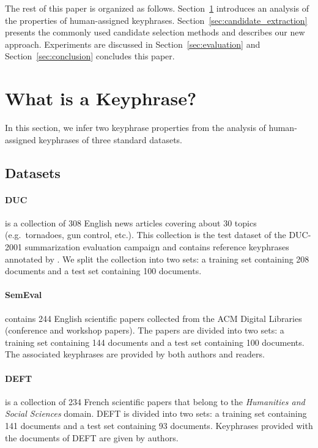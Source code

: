   The rest of this paper is organized as follows.
  Section~\ref{sec:definition_of_candidate_keyphrases} introduces an analysis of
  the properties of human-assigned keyphrases.
  Section~\ref{sec:candidate_extraction} presents the commonly used candidate
  selection methods and describes our new approach. Experiments are discussed in
  Section~\ref{sec:evaluation} and Section~\ref{sec:conclusion} concludes this
  paper.

\section{What is a Keyphrase?}
\label{sec:definition_of_candidate_keyphrases}
  In this section, we infer two keyphrase properties from the analysis of
  human-assigned keyphrases of three standard datasets.

  \subsection{Datasets}
  \label{subsec:keyphrase_extraction_datasets}
    \paragraph{DUC~\textnormal{\cite{over2001duc}}} is a collection of 308
    English news articles covering about 30 topics (e.g.~tornadoes, gun control,
    etc.). This collection is the test dataset of the DUC-2001 summarization
    evaluation campaign and contains reference keyphrases annotated by
    . We split the collection into two sets: a
    training set containing 208 documents and a test set containing 100
    documents.

    \paragraph{SemEval~\textnormal{\cite{kim2010semeval}}} contains 244 English
    scientific papers collected from the ACM Digital Libraries (conference and
    workshop papers). The papers are divided into two sets: a training set
    containing 144 documents and a test set containing 100 documents. The
    associated keyphrases are provided by both authors and readers.

    \paragraph{DEFT~\textnormal{\cite{paroubek2012deft}}} is a collection of 234
    French scientific papers that belong to the \textit{Humanities and Social
    Sciences} domain. DEFT is divided into two sets: a training set containing
    141 documents and a test set containing 93 documents. Keyphrases provided
    with the documents of DEFT are given by authors.

